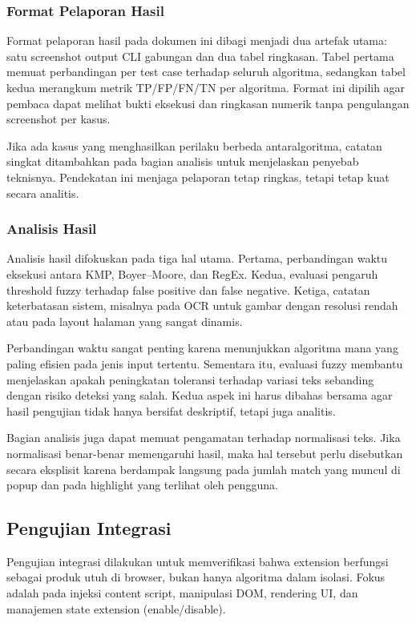 \subsubsection{Format Pelaporan Hasil}
Format pelaporan hasil pada dokumen ini dibagi menjadi dua artefak utama: satu screenshot output CLI gabungan dan dua tabel ringkasan. Tabel pertama memuat perbandingan per test case terhadap seluruh algoritma, sedangkan tabel kedua merangkum metrik TP/FP/FN/TN per algoritma. Format ini dipilih agar pembaca dapat melihat bukti eksekusi dan ringkasan numerik tanpa pengulangan screenshot per kasus.

Jika ada kasus yang menghasilkan perilaku berbeda antaralgoritma, catatan singkat ditambahkan pada bagian analisis untuk menjelaskan penyebab teknisnya. Pendekatan ini menjaga pelaporan tetap ringkas, tetapi tetap kuat secara analitis.

\subsubsection{Analisis Hasil}
Analisis hasil difokuskan pada tiga hal utama. Pertama, perbandingan waktu eksekusi antara KMP, Boyer--Moore, dan RegEx. Kedua, evaluasi pengaruh threshold fuzzy terhadap false positive dan false negative. Ketiga, catatan keterbatasan sistem, misalnya pada OCR untuk gambar dengan resolusi rendah atau pada layout halaman yang sangat dinamis.

Perbandingan waktu sangat penting karena menunjukkan algoritma mana yang paling efisien pada jenis input tertentu. Sementara itu, evaluasi fuzzy membantu menjelaskan apakah peningkatan toleransi terhadap variasi teks sebanding dengan risiko deteksi yang salah. Kedua aspek ini harus dibahas bersama agar hasil pengujian tidak hanya bersifat deskriptif, tetapi juga analitis.

Bagian analisis juga dapat memuat pengamatan terhadap normalisasi teks. Jika normalisasi benar-benar memengaruhi hasil, maka hal tersebut perlu disebutkan secara eksplisit karena berdampak langsung pada jumlah match yang muncul di popup dan pada highlight yang terlihat oleh pengguna.

\subsection{Pengujian Integrasi}

Pengujian integrasi dilakukan untuk memverifikasi bahwa extension berfungsi sebagai produk utuh di browser,
bukan hanya algoritma dalam isolasi. Fokus adalah pada injeksi content script, manipulasi DOM, rendering UI,
dan manajemen state extension (enable/disable).

